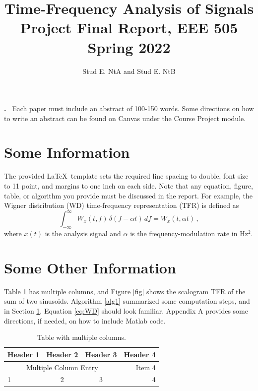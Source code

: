 \documentclass[11pt]{article}
\renewenvironment{abstract}
 {\par\noindent\textbf{\abstractname.}\ \ignorespaces}
 {\par\medskip}
\begin{document}
\title{\large {\bf Time-Frequency Analysis of Signals}\\[2mm]
Project Final Report, EEE 505 Spring 2022}

\author{\large  Stud E. NtA and Stud E. NtB}
\date{ } 

\maketitle

\doublespacing

\begin{abstract}
Each paper must include an abstract of 100-150 words.
Some directions on how to write an abstract can be found on Canvas
under  the Course Project module. 
\end{abstract}

\section{Some Information}
\label{sec:info}

The provided \LaTeX \ template sets  the required line spacing to double, font size to 11 point,
 and margins to one inch on each side.   Note that any equation, figure, table, or 
 algorithm  you provide must be  discussed in the report.  For example, 
the Wigner distribution (WD) time-frequency  representation (TFR)  is defined as  \cite{Hla92,Mal93}
 \begin{equation}
\int_{-\infty}^{\infty} W_x(t, f)  \, \delta (f - \alpha t ) \, df =    W_x(t, \alpha t ) \, ,
\label{eq:WD}
\end{equation}
where  $x(t)$ is the analysis signal and 
$\alpha$  is the frequency-modulation  rate in  Hz$^2$.  

 \section{Some Other Information}
 
Table \ref{table1} has multiple columns, and  Figure \ref{fig} 
shows the scalogram TFR of the sum of two  sinusoids. 
Algorithm \ref{alg1} summarized some computation steps, and in 
  Section \ref{sec:info},    Equation \eqref{eq:WD} should look familiar.
 Appendix A provides some directions, if needed,  on how to include  {\sc Matlab} code.
 
\begin{table}[h]
\begin{center}
   \begin{tabular}{| l | c | c | r| }  \hline 
   \textbf{Header 1} & \textbf{Header 2} & \textbf{Header 3} & \textbf{Header 4} \\[1mm]  \hline
   \multicolumn{3}{|c}{Multiple Column Entry} & Item 4 \\
1  &  2 &  3 &  4\\ \hline 
   \end{tabular}
   \end{center}
    \caption{Table with multiple columns.} 
   \label{table1}
\end{table}
\end{document}

